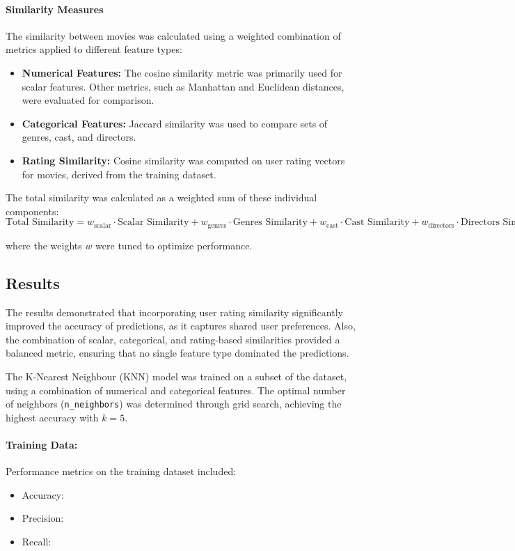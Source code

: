 \documentclass[a4paper,10pt]{article}
\begin{document}
\paragraph{Similarity Measures}
The similarity between movies was calculated using a weighted
combination of metrics applied to different feature types:

\begin{itemize}
    \item \textbf{Numerical Features:} The cosine similarity metric was primarily used for scalar features. Other metrics, such as Manhattan and Euclidean distances, were evaluated for comparison.
    \item \textbf{Categorical Features:} Jaccard similarity was used to compare sets of genres, cast, and directors.
    \item \textbf{Rating Similarity:} Cosine similarity was computed on user rating vectors for movies, derived from the training dataset.
\end{itemize}

The total similarity was calculated as a weighted sum of these individual
components:
\[
\text{Total Similarity} = w_\text{scalar} \cdot \text{Scalar Similarity} + w_\text{genres} \cdot \text{Genres Similarity} + w_\text{cast} \cdot \text{Cast Similarity} + w_\text{directors} \cdot \text{Directors Similarity} + w_\text{ratings} \cdot \text{Ratings Similarity}
\]

where the weights $w$ were tuned to optimize performance.

\subsection{Results}
The results demonstrated that incorporating user rating similarity
significantly improved the accuracy of predictions, as it captures
shared user preferences. Also, the combination of scalar, categorical,
and rating-based similarities provided a balanced metric,
ensuring that no single feature type dominated the predictions.

The K-Nearest Neighbour (KNN) model was trained on a subset of the dataset,
using a combination of numerical and categorical features.
The optimal number of neighbors (\texttt{n\_neighbors}) was determined
through grid search, achieving the highest accuracy with \( k = 5 \).

\paragraph{Training Data:}
Performance metrics on the training dataset included:
\begin{itemize}
    \item Accuracy:
    \item Precision:
    \item Recall:
\end{itemize}
\end{document}
